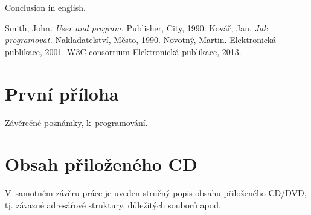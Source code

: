 \documentclass[12pt]{article}
\begin{document}
\begin{conclusions-en}
  Conclusion in english.
\end{conclusions-en}


\newpage
\begin{thebibliography}{99}

 Smith, John. \emph{User and program.}
                Publisher, City, 1990.
 Kovář, Jan. \emph{Jak programovat.}
                Nakladatelství, Město, 1990.
 Novotný, Martin.
                Elektronická publikace, 2001.
   W3C consortium
                Elektronická publikace, 2013.

\end{thebibliography}


\newpage
\appendix

\section{První příloha} \label{PrvniPriloha}
Závěrečné poznámky, k~programování.

\newpage
\section{Obsah přiloženého CD} \label{ObsahCD}
V~samotném závěru práce je uveden stručný popis obsahu přiloženého
CD/DVD, tj. závazné adresářové struktury, důležitých souborů apod.
\end{document}
